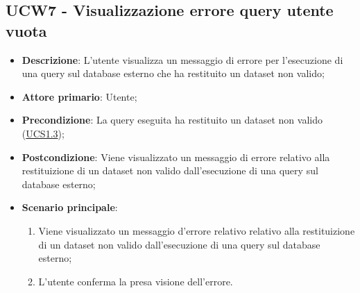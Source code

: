 \subsection{UCW7 - Visualizzazione errore query utente vuota}
\label{sub:ucw7}
\begin{itemize}
    \item \textbf{Descrizione}: L'utente visualizza un messaggio di errore per l'esecuzione di una query sul database 
    esterno che ha restituito un dataset non valido;

    \item \textbf{Attore primario}: Utente;
    
    \item \textbf{Precondizione}:   La query eseguita ha restituito un dataset non valido 
    (\hyperref[ssub:ucs1.3]{UCS1.3});

    \item \textbf{Postcondizione}:   Viene visualizzato un messaggio di errore relativo alla restituizione di un dataset non valido dall'esecuzione di una query sul database esterno;
    
    \item \textbf{Scenario principale}:
    \begin{enumerate}
        \item Viene visualizzato un messaggio d'errore relativo relativo alla restituizione di un dataset non valido 
        dall'esecuzione di una query sul database esterno;
        \item L'utente conferma la presa visione dell'errore.
    \end{enumerate}

\end{itemize}
